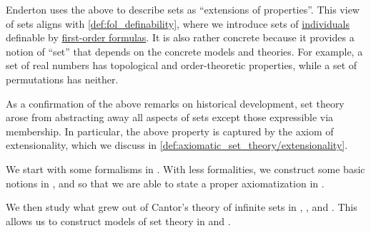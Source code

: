 Enderton uses the above to describe sets as \enquote{extensions of properties}. This view of sets aligns with \cref{def:fol_definability}, where we introduce sets of \hyperref[con:predicate_logic/types]{individuals} definable by \hyperref[def:fol_formula]{first-order formulas}. It is also rather concrete because it provides a notion of \enquote{set} that depends on the concrete models and theories. For example, a set of real numbers has topological and order-theoretic properties, while a set of permutations has neither.

As a confirmation of the above remarks on historical development, set theory arose from abstracting away all aspects of sets except those expressible via membership. In particular, the above property is captured by the axiom of extensionality, which we discuss in \cref{def:axiomatic_set_theory/extensionality}.

We start with some formalisms in . With less formalities, we construct some basic notions in ,  and  so that we are able to state a proper axiomatization in .

We then study what grew out of Cantor's theory of infinite sets in , ,  and . This allows us to construct models of set theory in  and .

